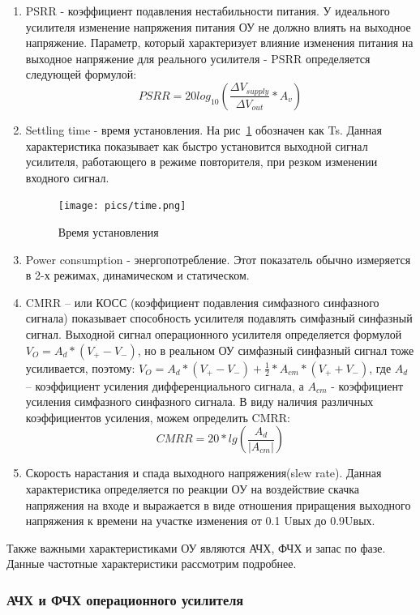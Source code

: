 \documentclass[a4paper,12pt,oneside]{scrartcl}
\begin{document}
\begin{enumerate}
    \item PSRR - коэффициент подавления нестабильности питания. У идеального усилителя изменение напряжения питания ОУ не должно влиять на выходное напряжение. Параметр, который характеризует влияние изменения питания на выходное напряжение для реального усилителя - PSRR определяется следующей формулой:
    $$PSRR = 20 log_{10}(\frac{\Delta V_{supply}}{\Delta V_{out}} * A_{v})$$
    \item Settling time - время установления. На рис~\ref{fig:Time} обозначен как Ts. Данная характеристика показывает как быстро установится выходной сигнал усилителя, работающего в режиме повторителя, при резком изменении входного сигнал.~\cite{B5}
    \begin{figure}[!htb]
    \centering
    \texttt{[image: pics/time.png]}
    \caption{Время установления}
    \label{fig:Time}
    \end{figure}
    
    \item Power consumption - энергопотребление. Этот показатель обычно измеряется в 2-х режимах, динамическом и статическом.
    \item CMRR – или КОСС (коэффициент подавления симфазного синфазного сигнала) показывает способность усилителя подавлять симфазный синфазный сигнал. Выходной сигнал операционного усилителя определяется формулой $V_{O}= A_{d}*(V_{+} - V_{-})$, но в реальном ОУ симфазный синфазный сигнал тоже усиливается, поэтому: $V_{O}= A_{d}*(V_{+} - V_{-})+ \frac{1}{2}*A_{cm}*(V_{+}+ V_{-})$, где $A_{d}$ – коэффициент усиления дифференциального сигнала, а $A_{cm}$ - коэффициент усиления симфазного синфазного сигнала. В виду наличия различных коэффициентов усиления, можем определить CMRR:
    $$CMRR = 20*lg(\frac{A_{d}}{|A_{cm}|})$$
    \item Скорость нарастания и спада выходного напряжения(slew rate). Данная характеристика определяется по реакции ОУ на воздействие скачка напряжения на входе и выражается в виде отношения приращения выходного напряжения к времени на участке изменения от 0.1 Uвых до 0.9Uвых.~\cite{B5}
\end{enumerate}

Также важными характеристиками ОУ являются АЧХ, ФЧХ и запас по фазе. Данные частотные характеристики рассмотрим подробнее.
\FloatBarrier







\subsubsection{АЧХ и ФЧХ операционного усилителя}
\end{document}
